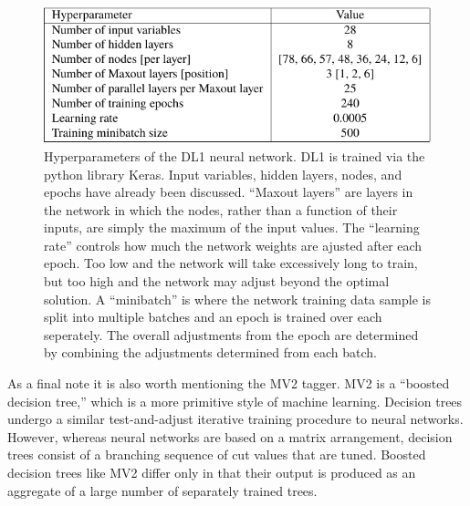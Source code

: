         
            \begin{figure}[tbh] \center
                \includegraphics[width=0.7\linewidth,height=\textheight,keepaspectratio]{tables/reconstruction/DL1_hyperparams}
                \caption{
                    Hyperparameters of the DL1 neural network\cite{bjet_id_and_performance}.
                    DL1 is trained via the python library Keras.
                    Input variables, hidden layers, nodes, and epochs have already been discussed.
                    ``Maxout layers'' are layers in the network in which the nodes, rather than a function of their inputs,
                        are simply the maximum of the input values.
                    The ``learning rate'' controls how much the network weights are ajusted after each epoch.
                    Too low and the network will take excessively long to train,
                        but too high and the network may adjust beyond the optimal solution.
                    A ``minibatch'' is where the network training data sample is split into multiple batches and an epoch is trained over each seperately.
                    The overall adjustments from the epoch are determined by combining the adjustments determined from each batch.
                }
                \label{tab:DL1_hyperparams}
            \end{figure}

            As a final note it is also worth mentioning the MV2 tagger.
            MV2 is a ``boosted decision tree,'' which is a more primitive style of machine learning.
            Decision trees undergo a similar test-and-adjust iterative training procedure to neural networks.
            However, whereas neural networks are based on a matrix arrangement,
                decision trees consist of a branching sequence of cut values that are tuned.
            Boosted decision trees like MV2 differ only in that their output is produced as an aggregate of a large number of
                separately trained trees.


